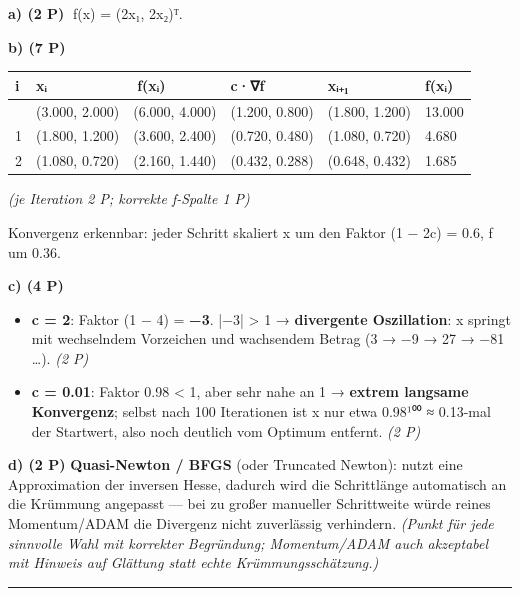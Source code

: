 \documentclass[11pt, a4paper]{article}
\begin{document}
\textbf{a) (2 P)} ∇f(x⃗) = (2x₁, 2x₂)ᵀ.


\textbf{b) (7 P)}



{\small
\begin{tabularx}{\linewidth}{XXXXXX}
\hline
\rowcolor{tableheadbg}
{\color{white}\textbf{i}} & {\color{white}\textbf{x⃗ᵢ}} & {\color{white}\textbf{∇f(x⃗ᵢ)}} & {\color{white}\textbf{c·∇f}} & {\color{white}\textbf{x⃗ᵢ₊₁}} & {\color{white}\textbf{f(x⃗ᵢ)}} \\[2pt]
\hline
\endhead
\hline
\endfoot
0 & (3.000, 2.000) & (6.000, 4.000) & (1.200, 0.800) & (1.800, 1.200) & 13.000 \\
1 & (1.800, 1.200) & (3.600, 2.400) & (0.720, 0.480) & (1.080, 0.720) & 4.680 \\
2 & (1.080, 0.720) & (2.160, 1.440) & (0.432, 0.288) & (0.648, 0.432) & 1.685 \\
\end{tabularx}
}


\textit{(je Iteration 2 P; korrekte f-Spalte 1 P)}


Konvergenz erkennbar: jeder Schritt skaliert x⃗ um den Faktor (1 − 2c) = 0.6, f um 0.36.


\textbf{c) (4 P)}

\begin{itemize}
  \item \textbf{c = 2}: Faktor (1 − 4) = \textbf{−3}. |−3| > 1 → \textbf{divergente Oszillation}: x springt mit wechselndem Vorzeichen und wachsendem Betrag (3 → −9 → 27 → −81 …). \textit{(2 P)}
  \item \textbf{c = 0.01}: Faktor 0.98 < 1, aber sehr nahe an 1 → \textbf{extrem langsame Konvergenz}; selbst nach 100 Iterationen ist x⃗ nur etwa 0.98¹⁰⁰ ≈ 0.13-mal der Startwert, also noch deutlich vom Optimum entfernt. \textit{(2 P)}
\end{itemize}

\textbf{d) (2 P)} \textbf{Quasi-Newton / BFGS} (oder Truncated Newton): nutzt eine Approximation der inversen Hesse, dadurch wird die Schrittlänge automatisch an die Krümmung angepasst — bei zu großer manueller Schrittweite würde reines Momentum/ADAM die Divergenz nicht zuverlässig verhindern. \textit{(Punkt für jede sinnvolle Wahl mit korrekter Begründung; Momentum/ADAM auch akzeptabel mit Hinweis auf Glättung statt echte Krümmungsschätzung.)}



\noindent\textcolor{rulegray}{\rule{\linewidth}{0.4pt}}
\end{document}
